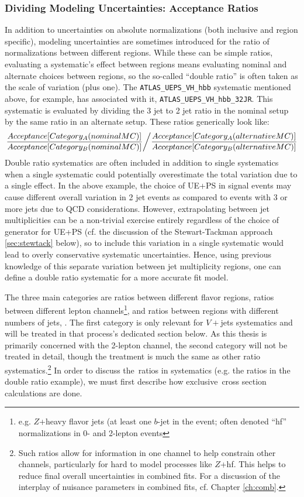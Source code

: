 \subsubsection{Dividing Modeling Uncertainties: Acceptance Ratios}
\label{sec:doubleratio}
In addition to uncertainties on absolute normalizations (both inclusive and region specific), modeling uncertainties are sometimes introduced for the ratio of normalizations between different regions.  While these can be simple ratios, evaluating a systematic's effect between regions means evaluating nominal and alternate choices between regions, so the so-called ``double ratio'' is often taken as the scale of variation (plus one).  The \texttt{ATLAS\_UEPS\_VH\_hbb} systematic mentioned above, for example, has associated with it, \texttt{ATLAS\_UEPS\_VH\_hbb\_32JR}.  This systematic is evaluated by dividing the 3 jet to 2 jet ratio in the nominal setup by the same ratio in an alternate setup.  These ratios generically look like:
\begin{equation}
\label{eqn:doubleratio}
\left. \dfrac{Acceptance[Category_{A}(nominal MC)]}{Acceptance[Category_{B}(nominal MC)]} \middle/ \dfrac{Acceptance[Category_{A}(alternative MC)]}{Acceptance[Category_{B}(alternative MC)]} \right.
\end{equation}
Double ratio systematics are often included in addition to single systematics when a single systematic could potentially overestimate the total variation due to a single effect.  In the above example, the choice of UE+PS in signal events may cause different overall variation in 2 jet events as compared to events with 3 or more jets due to QCD considerations.  However, extrapolating between jet multiplicities can be a non-trivial exercise entirely regardless of the choice of generator for UE+PS (cf. the discussion of the Stewart-Tackman approach \ref{sec:stewtack} below), so to include this variation in a single systematic would lead to overly conservative systematic uncertainties.  Hence, using previous knowledge of this separate variation between jet multiplicity regions, one can define a double ratio systematic for a more accurate fit model.

  The three main categories are ratios between different flavor regions, ratios between different lepton channels\footnote{e.g. $Z$+heavy flavor jets (at least one $b$-jet in the event; often denoted ``hf'' normalizations in 0- and 2-lepton events}, and ratios between regions with different numbers of jets, \nj.  The first category is only relevant for $V+$jets systematics and will be treated in that process's dedicated section below.  As this thesis is primarily concerned with the 2-lepton channel, the second category will not be treated in detail, though the treatment is much the same as other ratio systematics.\footnote{Such ratios allow for information in one channel to help constrain other channels, particularly for hard to model processes like $Z$+hf.  This helps to reduce final overall uncertainties in combined fits.  For a discussion of the interplay of nuisance parameters in combined fits, cf. Chapter \ref{ch:comb}.}  In order to discuss the \nj\,ratios in systematics (e.g. the ratios in the double ratio example), we must first describe how exclusive \nj\,cross section calculations are done.

